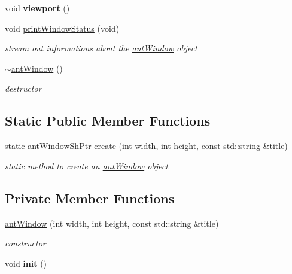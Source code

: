 \begin{DoxyCompactItemize}
\item 
\hypertarget{classant_window_acde1aace224a84c9c51d858932cd3e9d}{void {\bfseries viewport} ()}\label{classant_window_acde1aace224a84c9c51d858932cd3e9d}

\item 
void \hyperlink{classant_window_a6e12ebc5212196d5eae855762d182782}{print\+Window\+Status} (void)
\begin{DoxyCompactList}\small\item\em stream out informations about the \hyperlink{classant_window}{ant\+Window} object \end{DoxyCompactList}\item 
\hyperlink{classant_window_a1d59042b3c9a5e98db451ce13b0d0553}{$\sim$ant\+Window} ()
\begin{DoxyCompactList}\small\item\em destructor \end{DoxyCompactList}\end{DoxyCompactItemize}
\subsection*{Static Public Member Functions}
\begin{DoxyCompactItemize}
\item 
static ant\+Window\+Sh\+Ptr \hyperlink{classant_window_ad91cfd2dcb6c03472036ab5c2336b239}{create} (int width, int height, const std\+::string \&title)
\begin{DoxyCompactList}\small\item\em static method to create an \hyperlink{classant_window}{ant\+Window} object \end{DoxyCompactList}\end{DoxyCompactItemize}
\subsection*{Private Member Functions}
\begin{DoxyCompactItemize}
\item 
\hyperlink{classant_window_a8587e92cdc039ad0d3e5dbddd6b37600}{ant\+Window} (int width, int height, const std\+::string \&title)
\begin{DoxyCompactList}\small\item\em constructor \end{DoxyCompactList}\item 
\hypertarget{classant_window_ad85470c2398926767305d423404ad4db}{void {\bfseries init} ()}\label{classant_window_ad85470c2398926767305d423404ad4db}

\end{DoxyCompactItemize}

